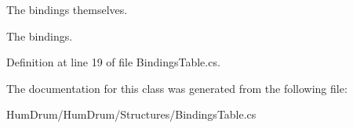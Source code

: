 The bindings themselves. 

The bindings.

Definition at line 19 of file Bindings\+Table.\+cs.



The documentation for this class was generated from the following file\+:\begin{DoxyCompactItemize}
\item 
Hum\+Drum/\+Hum\+Drum/\+Structures/Bindings\+Table.\+cs\end{DoxyCompactItemize}
